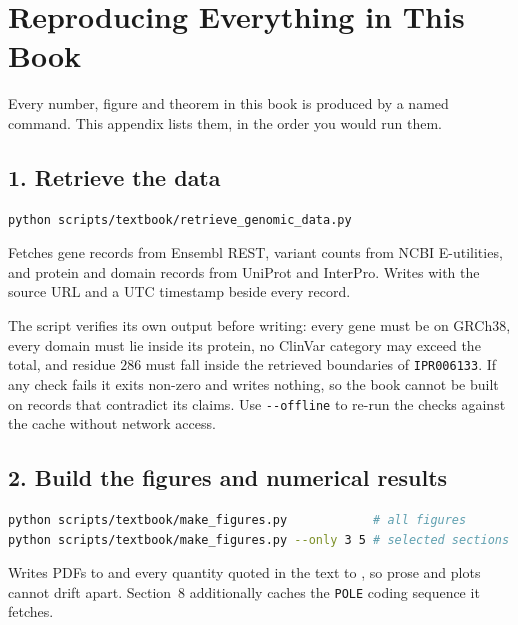 \section{Reproducing Everything in This Book}\label{app:repro}

Every number, figure and theorem in this book is produced by a named command.
This appendix lists them, in the order you would run them.

\subsection*{1. Retrieve the data}

\begin{lstlisting}[language=bash,style=lean,morekeywords={python}]
python scripts/textbook/retrieve_genomic_data.py
\end{lstlisting}

Fetches gene records from Ensembl REST, variant counts from NCBI E-utilities,
and protein and domain records from UniProt and InterPro. Writes
 with the source URL and a UTC
timestamp beside every record.

The script verifies its own output before writing: every gene must be on GRCh38,
every domain must lie inside its protein, no ClinVar category may exceed the
total, and residue $286$ must fall inside the retrieved boundaries of
\texttt{IPR006133}. If any check fails it exits non-zero and writes nothing, so
the book cannot be built on records that contradict its claims. Use
\texttt{-{}-offline} to re-run the checks against the cache without network
access.

\subsection*{2. Build the figures and numerical results}

\begin{lstlisting}[language=bash,style=lean,morekeywords={python}]
python scripts/textbook/make_figures.py            # all figures
python scripts/textbook/make_figures.py --only 3 5 # selected sections
\end{lstlisting}

Writes PDFs to  and every quantity quoted in the text to
, so prose and plots cannot drift apart.
Section~8 additionally caches the \texttt{POLE} coding sequence it fetches.

